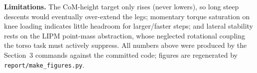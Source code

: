 \documentclass[10pt,a4paper]{article}
\newcommand{\code}[1]{\texttt{\small #1}}
\begin{document}
\textbf{Limitations.} The CoM-height target only rises (never lowers), so long
steep descents would eventually over-extend the legs; momentary torque saturation
on knee loading indicates little headroom for larger/faster steps; and lateral
stability rests on the LIPM point-mass abstraction, whose neglected rotational
coupling the torso task must actively suppress. All numbers above were produced by
the Section~3 commands against the committed code; figures are regenerated by
\code{report/make\_figures.py}.
\end{document}
